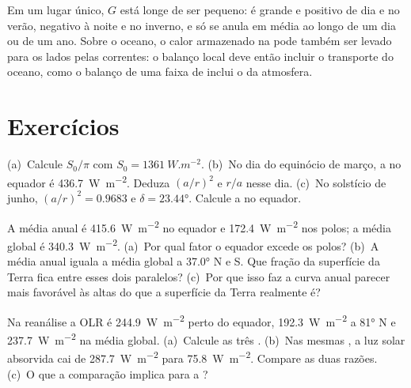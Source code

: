 \begin{remark}\label{rem:b1:radiation-heat-transport:local}
Em um lugar único, $G$ está longe de ser pequeno: é grande e positivo de dia e no verão, negativo à
noite e no inverno, e só se anula em média ao longo de um dia ou de um ano. Sobre o oceano, o calor
armazenado na  pode também ser levado para os lados pelas correntes: o balanço
local deve então incluir o transporte do oceano, como o balanço de uma faixa de  inclui o
da atmosfera.
\end{remark}

\section{Exercícios}

\begin{exercise}[$\star$]\label{exo:b1:radiation-heat-transport:1}
(a)~Calcule $S_0/\pi$ com $S_0 = \qty{1361}{W.m^{-2}}$. (b)~No dia do equinócio de março, a
 no equador é \qty{436.7}{W.m^{-2}}. Deduza $(a/r)^2$ e $r/a$ nesse dia.
(c)~No solstício de junho, $(a/r)^2 = 0.9683$ e $\delta = \ang{23.44}$. Calcule a  no equador.
\end{exercise}

\begin{exercise}[$\star$]\label{exo:b1:radiation-heat-transport:2}
A  média anual é \qty{415.6}{W.m^{-2}} no equador e \qty{172.4}{W.m^{-2}} nos polos; a
média global é \qty{340.3}{W.m^{-2}}. (a)~Por qual fator o equador excede os polos? (b)~A média
anual iguala a média global a \ang{37.0} N e S. Que fração da superfície da Terra fica entre esses
dois paralelos? (c)~Por que isso faz a curva anual parecer mais favorável às altas  do que
a superfície da Terra realmente é?
\end{exercise}

\begin{exercise}[$\star$]\label{exo:b1:radiation-heat-transport:3}
Na reanálise a OLR é \qty{244.9}{W.m^{-2}} perto do equador, \qty{192.3}{W.m^{-2}} a \ang{81} N e
\qty{237.7}{W.m^{-2}} na média global. (a)~Calcule as três . (b)~Nas mesmas
, a luz solar absorvida cai de \qty{287.7}{W.m^{-2}} para \qty{75.8}{W.m^{-2}}. Compare as
duas razões. (c)~O que a comparação implica para a ?
\end{exercise}


